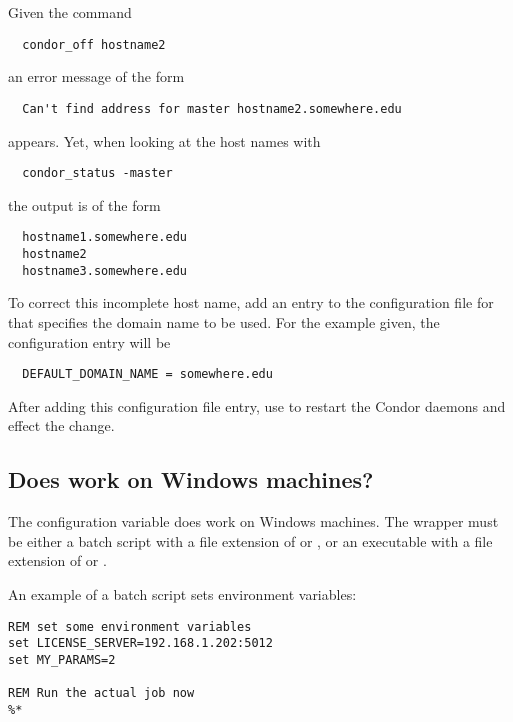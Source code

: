 Given the command
\begin{verbatim}
  condor_off hostname2
\end{verbatim}
an error message of the form
\begin{verbatim}
  Can't find address for master hostname2.somewhere.edu
\end{verbatim}
appears.
Yet, when looking at the host names with
\begin{verbatim}
  condor_status -master
\end{verbatim}
the output is of the form 
\begin{verbatim}
  hostname1.somewhere.edu
  hostname2
  hostname3.somewhere.edu
\end{verbatim}

To correct this incomplete host name, add an entry to the
configuration file for
that specifies the domain name to be used.
For the example given, the configuration entry will be
\begin{verbatim}
  DEFAULT_DOMAIN_NAME = somewhere.edu
\end{verbatim}

After adding this configuration file entry, use 
to restart the Condor daemons and effect the change.

%

\subsection*{Does  work on Windows machines?}
The  configuration variable
does work on Windows machines.
The wrapper must be either a
batch script with a file extension of  or ,
or an
executable with a file extension of  or .

An example of a batch script sets environment variables:
\footnotesize
\begin{verbatim}
REM set some environment variables
set LICENSE_SERVER=192.168.1.202:5012
set MY_PARAMS=2

REM Run the actual job now
%*
\end{verbatim}
\normalsize


